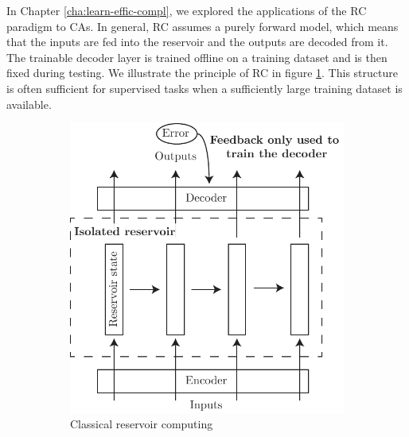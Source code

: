 In Chapter \ref{cha:learn-effic-compl}, we explored the applications of the
\acl{RC} paradigm to \acfp{CA}. In general, \ac{RC} assumes a purely forward
model, which means that the inputs are fed into the reservoir and the outputs are decoded from
it. The trainable decoder layer is trained offline on a training dataset and
is then fixed during testing. We illustrate the  principle of \ac{RC} in figure
\ref{fig:classical_reservoir}. This structure is often sufficient for supervised
tasks when a sufficiently large training dataset is available.

\begin{figure}[htbp]
  \centering
  \begin{subfigure}[t]{.5\linewidth}
    \centering
    \includegraphics[width=\linewidth]{figures/classical_reservoir.pdf}
    \caption{Classical reservoir computing}
    \label{fig:classical_reservoir}
  \end{subfigure}
  \begin{subfigure}[t]{.45\linewidth}
    \centering

\end{subfigure}
\end{figure}
